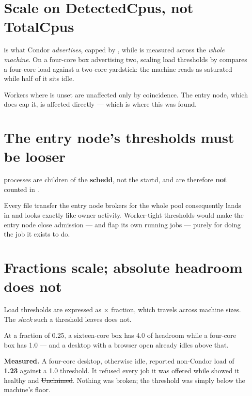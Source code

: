 \section{Scale on DetectedCpus, not TotalCpus}
\label{sec:detectedcpus}

 is what Condor \emph{advertises}, capped by , while
 is measured across the \emph{whole machine}. On a four-core box
advertising two, scaling load thresholds by  compares a four-core
load against a two-core yardstick: the machine reads as saturated while half of
it sits idle.

Workers where  is unset are unaffected only by coincidence. The
entry node, which does cap it, is affected directly --- which is where this was
found.

\section{The entry node's thresholds must be looser}
\label{sec:looser}

 processes are children of the \textbf{schedd}, not the
startd, and are therefore \textbf{not} counted in .

Every file transfer the entry node brokers for the whole pool consequently lands
in  and looks exactly like owner activity. Worker-tight
thresholds would make the entry node close admission --- and flap its own
running jobs --- purely for doing the job it exists to do.

\section{Fractions scale; absolute headroom does not}

Load thresholds are expressed as  $\times$ fraction, which travels
across machine sizes. The \emph{slack} such a threshold leaves does not.

At a fraction of 0.25, a sixteen-core box has 4.0 of headroom while a four-core
box has 1.0 --- and a desktop with a browser open already idles above that.

\begin{trap}
\textbf{Measured.} A four-core desktop, otherwise idle, reported non-Condor load
of \textbf{1.23} against a 1.0 threshold. It refused every job it was offered
while  showed it healthy and \st{Unclaimed}. Nothing was
broken; the threshold was simply below the machine's floor.
\end{trap}

